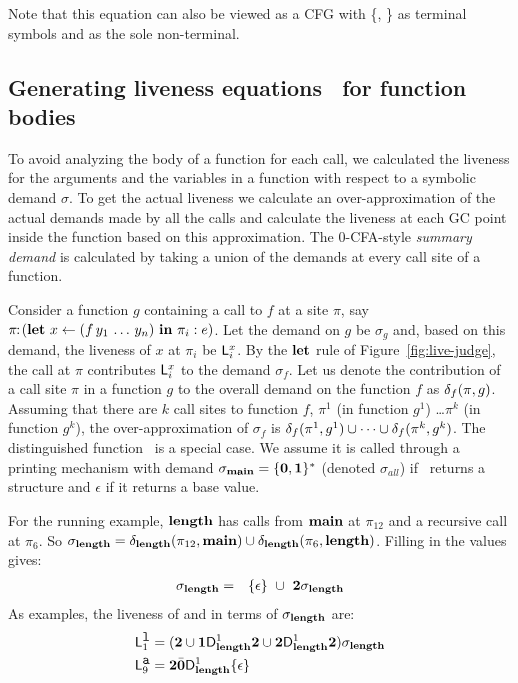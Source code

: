 \documentclass[9pt]{sigplanconf}
\begin{document}
Note that this equation can also be viewed as a CFG with \{\acdr,
\clazy\} as terminal symbols and  as the sole
non-terminal.

\subsection{Generating liveness equations \Lv\  for function bodies}
\label{sec:bodylivenessbodies}

To avoid analyzing the body of a function for each call, we calculated
the liveness  for the arguments and  the variables in  a function with
respect to a symbolic demand  $\sigma$.  To get the actual liveness we
calculate an over-approximation of the  actual demands made by all the
calls and calculate the liveness at each GC
point inside the  function based on this approximation.
The  0-CFA-style  {\em
  summary demand}  is calculated by taking  a union of  the demands at
every call site of a function.

Consider a function $g$ containing a  call to $f$ at a site $\pi$, say
$\pi\!\!:\!(\mbox{$\mathbf{ let}$}~x   \leftarrow   (f\,y_1\,\ldots\,y_n)~\mbox{$\mathbf{ in}$}~\pi_i:e)$.
Let the  demand on $g$  be $\sigma_g$ and,  based on this  demand, the
liveness of  $x$ at $\pi_i$ be  $\mathsf{L}_{{i}}^{x}$.  By the  $\mbox{$\mathbf{ let}$}$ rule of
Figure~\ref{fig:live-judge},    the   call   at    $\pi$   contributes
$\mathsf{L}_{{i}}^{x}$ to the demand $\sigma_f$. Let us denote the contribution
of a call  site $\pi$ in a  function $g$ to the overall  demand on the
function $f$  as $\delta_{f}({\pi},{g})$. Assuming that  there are $k$
call sites to function $f$, $\pi^1$ (in function $g^1$) \ldots $\pi^k$
(in   function  $g^k$),  the   over-approximation  of   $\sigma_f$  is
$\delta_{f}({\pi^1},{g^1})          \cup          \cdots          \cup
\delta_{f}({\pi^k},{g^k})$.  The distinguished function \mainpgm\ is a
special case.   We assume  it is called  through a  printing mechanism
with   demand   $\sigma_{\mathbf{main}}   =  \{\mathbf{0},\mathbf{1}\}^\ast$ (denoted
$\sigma_{\!all}$) if \mainpgm\ returns a structure and $\epsilon$ if
it returns a base value.


For  the  running  example,   $\mathbf{length}$  has  calls  from  $\mathbf{main}$  at
$\pi_{12}$ and a recursive call at $\pi_6$.
So $\sigma_{\mathbf{length}} =
     \delta_{\mathbf{length}}({\pi_{12}},{\mathbf{main}})  \cup
\delta_{\mathbf{length}}({\pi_6},{\mathbf{length}})$.
Filling in  the values gives:
\begin{eqnarray*}
\sigma_{\mathbf{length}}    &=&
 \{\epsilon\}  ~\cup~{{\mathbf{2}}\sigma_{\mathit{\mathbf{length}}}}
\end{eqnarray*}
As examples, the liveness of  and  in terms
of  $\sigma_{\mathbf{length}}$ are:
\begin{align*}
\mathsf{L}_{{1}}^{\mbox{\tt l}} &= ({\mathbf{2}} \cup \mathbf{1}\mathsf{D}_{\mathit {\mathbf{length}}}^{1}{\mathbf{2}}
  \cup {\mathbf{2}}\mathsf{D}_{\mathit {\mathbf{length}}}^{1}{{\mathbf{2}}})\sigma_{\mathit{\mathbf{length}}}
 \\
\mathsf{L}_{{9}}^{\mbox{\tt a}} &= {\mathbf{2}} \bar{\mathbf{0}} \mathsf{D}_{\mathit {\mathbf{length}}}^{1}\{\epsilon\}
\end{align*}
\end{document}
